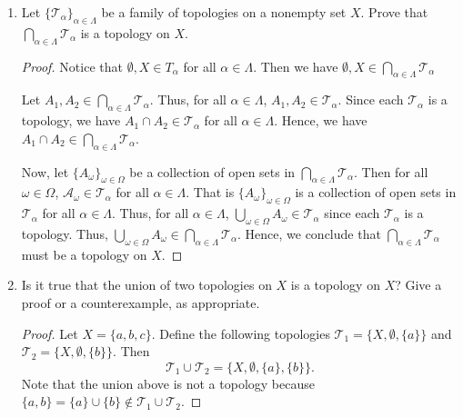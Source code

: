 \documentclass[a4paper]{article}
\begin{document}
\begin{problem}
   \begin{enumerate}
       \item[(i)] Let \( \{ {\mathcal{T}}_{\alpha} \}_{\alpha \in \Lambda} \) be a family of topologies on a nonempty set \( X  \). Prove that \( \bigcap_{ \alpha \in \Lambda }^{  }  {\mathcal{T}}_{\alpha} \) is a topology on \( X  \).
           \begin{proof}
               Notice that \( \emptyset , X \in {T}_{\alpha} \) for all \( \alpha \in \Lambda \). Then we have \( \emptyset, X \in \bigcap_{ \alpha \in \Lambda }^{  } {\mathcal{T}}_{\alpha} \)

               Let \( {A}_{1}, {A}_{2} \in \bigcap_{ \alpha \in \Lambda  }^{   }  {\mathcal{T}}_{\alpha} \). Thus, for all \( \alpha \in \Lambda \), \( {A}_{1}, {A}_{2} \in {\mathcal{T}}_{\alpha} \). Since each \( {\mathcal{T}}_{\alpha} \) is a topology, we have \( {A}_{1} \cap {A}_{2} \in {\mathcal{T}}_{\alpha}  \) for all \( \alpha \in \Lambda \). Hence, we have \( {A}_{1} \cap {A}_{2} \in \bigcap_{ \alpha \in \Lambda }^{  } {\mathcal{T}}_{\alpha} \). 

               Now, let \( \{ {A}_{\omega} \}_{\omega \in \Omega} \) be a collection of open sets in \( \bigcap_{ \alpha \in \Lambda }^{  }  {\mathcal{T}}_{\alpha} \). Then for all \( \omega \in \Omega \), \( \mathcal{A}_{\omega} \in {\mathcal{T}}_{\alpha}  \) for all \( \alpha \in \Lambda \). That is \( \{ {A}_{\omega} \}_{\omega \in \Omega} \) is a collection of open sets in \( {\mathcal{T}}_{\alpha} \) for all \( \alpha \in \Lambda \). Thus, for all \( \alpha \in \Lambda \), \( \bigcup_{ \omega \in \Omega }^{  }  {A}_{\omega}  \in {\mathcal{T}}_{\alpha} \) since each \( {\mathcal{T}}_{\alpha} \) is a topology. Thus, \( \bigcup_{ \omega \in \Omega }^{  }  {A}_{\omega} \in \bigcap_{ \alpha \in \Lambda }^{  }  {\mathcal{T}}_{\alpha} \).
               Hence, we conclude that \( \bigcap_{ \alpha \in \Lambda }^{  } {\mathcal{T}}_{\alpha} \) must be a topology on \( X  \).
           \end{proof}
        \item[(ii)] Is it true that the union of two topologies on \( X  \) is a topology on \( X  \)? Give a proof or a counterexample, as appropriate.
            \begin{proof}
            Let \( X = \{  a, b , c  \}  \). Define the following topologies \( {\mathcal{T}}_{1} = \{  X , \emptyset , \{ a  \} \}  \) and \( {\mathcal{T}}_{2} = \{  X ,\emptyset , \{  b  \}  \}  \). Then 
            \[  {\mathcal{T}}_{1} \cup {\mathcal{T}}_{2} = \{  X , \emptyset, \{ a  \} , \{  b  \}  \}. \]
            Note that the union above is not a topology because \( \{ a,b \}  =  \{ a  \}  \cup \{ b  \} \not\in {\mathcal{T}}_{1} \cup {\mathcal{T}}_{2} \). 
            \end{proof}
   \end{enumerate} 
\end{problem}
\end{document}
